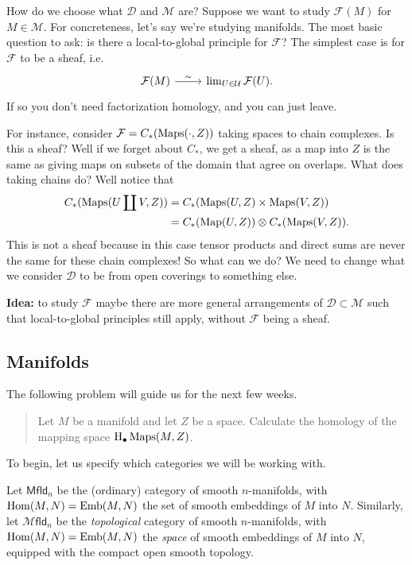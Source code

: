 \documentclass{amsart}
\DeclareMathOperator{\Emb}{Emb}
\begin{document}
How do we choose what $\mathcal{D}$ and $\mathcal{M}$ are? Suppose we want to study
$\mathcal{F}(M)$ for $M\in\mathcal{M}$. For concreteness, let's say we're studying
manifolds. The most basic question to ask: is there a local-to-global principle for
$\mathcal{F}$? The simplest case is for $\mathcal{F}$ to be a sheaf, i.e.
\begin{equation*}
    \begin{tikzcd}
        \mathcal{F}(M) \rar{\sim} & \lim_{U\in\mathcal{U}} \mathcal{F}(U).
    \end{tikzcd}
\end{equation*}
If so you don't need factorization homology, and you can just leave.

For instance, consider $\mathcal{F}=C_*(\operatorname{Maps}(\cdot, Z))$ taking spaces to chain
complexes. Is this a sheaf? Well if we forget about $C_*$, we get a sheaf, as a
map into $Z$ is the same as giving maps on subsets of the domain that agree on overlaps.
What does
taking chains do? Well notice that
\begin{align*}
    C_*(\operatorname{Maps}(U\coprod V,Z)) &= C_*(\operatorname{Maps}(U,Z)\times\operatorname{Maps}(V,Z))\\
    &= C_*(\operatorname*{Map}(U,Z)) \otimes C_*(\operatorname{Maps}(V,Z)).
\end{align*}
This is not a sheaf because in this case tensor products and direct sums are never
the same for these chain complexes! 
So what can we do? We need to change what we consider $\mathcal{D}$ to be from
open coverings to something else.

\textbf{Idea:} to study $\mathcal{F}$ maybe there are more general arrangements of
$\mathcal{D}\subset\mathcal{M}$ such that local-to-global principles still apply, without
$\mathcal{F}$ being a sheaf.

\subsection{Manifolds}

The following problem will guide us for the next few weeks.
\begin{quote}
    Let $M$ be a manifold and let $Z$ be a space.
    Calculate the homology of the mapping space $\operatorname{H}_\bullet\operatorname{Maps}(M,Z)$.
\end{quote}

To begin, let us specify which categories we will be working with.
\begin{definition}
    Let $\mathsf{Mfld}_n$ be the (ordinary) category of smooth $n$-manifolds, with
    $\Hom(M,N)=\Emb(M,N)$ the set of smooth embeddings of $M$ into $N$.
    Similarly, 
    let $\mathcal{M}\mathsf{fld}_n$ be the \textit{topological} category of smooth $n$-manifolds, with
    $\Hom(M,N)=\Emb(M,N)$ the \textit{space} of smooth embeddings of $M$ into $N$, equipped with the
    compact open smooth topology.
\end{definition}
\end{document}
